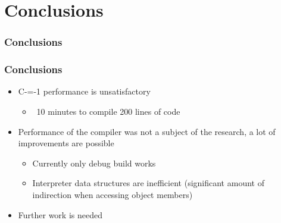 \section{Conclusions}

\begin{frame}
    \frametitle{Conclusions}

    

\end{frame}

\begin{frame}
    \frametitle{Conclusions}

    \begin{itemize}
        \item C-=-1 performance is unsatisfactory\begin{itemize}
            \item ~10 minutes to compile 200 lines of code
        \end{itemize}
        \item Performance of the compiler was not a subject of the research, a lot of improvements are possible\begin{itemize}
            \item Currently only debug build works
            \item Interpreter data structures are inefficient (significant amount of indirection when accessing object members)
        \end{itemize}
        \item Further work is needed
    \end{itemize}

\end{frame}
